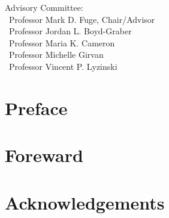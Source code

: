 \documentclass[%
	12pt,
		oneside,
		letterpaper
]{book}
\renewcommand{\contentsname}%
    {Table of contents}%
\renewcommand*\contentsname{Table of contents}
\newcommand\contentsname{Table of contents}
\begin{document}
\vspace{7.5em}

\noindent Advisory Committee: \\
\hbox{\ }\hspace{.5in}Professor Mark D. Fuge, Chair/Advisor \\
\hbox{\ }\hspace{.5in}Professor Jordan L. Boyd-Graber \\
\hbox{\ }\hspace{.5in}Professor Maria K. Cameron \\
\hbox{\ }\hspace{.5in}Professor Michelle Girvan \\
\hbox{\ }\hspace{.5in}Professor Vincent P. Lyzinski \\
 \doublespacing


% 

% 


\chapter*{Preface}\label{preface}




\chapter*{Foreward}\label{foreward}



\chapter*{Acknowledgements}\label{acknowledgements}


    \renewcommand{\contentsname}{Table of Contents}
\renewcommand{\baselinestretch}{1}
\small\normalsize
\tableofcontents %
\newpage
\end{document}
